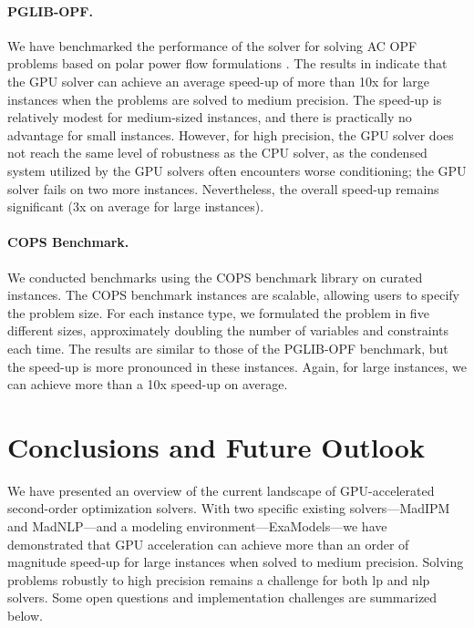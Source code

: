 \documentclass{article}
\begin{document}
\paragraph{PGLIB-OPF.}
We have benchmarked the performance of the solver for solving AC OPF problems based on polar power flow formulations \cite{PowerModelsJLOpenSource}. The results in  indicate that the GPU solver can achieve an average speed-up of more than 10x for large instances when the problems are solved to medium precision. The speed-up is relatively modest for medium-sized instances, and there is practically no advantage for small instances. However, for high precision, the GPU solver does not reach the same level of robustness as the CPU solver, as the condensed system utilized by the GPU solvers often encounters worse conditioning; the GPU solver fails on two more instances. Nevertheless, the overall speed-up remains significant (3x on average for large instances).

\paragraph{COPS Benchmark.}
We conducted benchmarks using the COPS benchmark library on curated instances. The COPS benchmark instances are scalable, allowing users to specify the problem size. For each instance type, we formulated the problem in five different sizes, approximately doubling the number of variables and constraints each time. The results are similar to those of the PGLIB-OPF benchmark, but the speed-up is more pronounced in these instances. Again, for large instances, we can achieve more than a 10x speed-up on average.

\section{Conclusions and Future Outlook}\label{eqn:conclusion}
We have presented an overview of the current landscape of GPU-accelerated second-order optimization solvers. With two specific existing solvers—MadIPM and MadNLP—and a modeling environment---ExaModels---we have demonstrated that GPU acceleration can achieve more than an order of magnitude speed-up for large instances when solved to medium precision. Solving problems robustly to high precision remains a challenge for both \gls*{lp} and \gls*{nlp} solvers. Some open questions and implementation challenges are summarized below.
\end{document}
